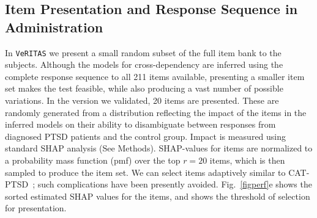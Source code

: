 \documentclass[onecolumn,10pt]{IEEEtran}
\def\Methods{Online Methods}
\def\Methods{Methods\xspace}
\def\vrts{\texttt{VeRITAS}\xspace}
\begin{document}
\subsection*{Item Presentation and Response Sequence in Administration}
In \vrts we present  a small random subset of the full item bank to the subjects. Although the models for cross-dependency are inferred using the complete response sequence to all 211 items available, presenting a smaller  item set makes the test feasible, while also producing a vast number of possible variations. In the version we validated, 20 items are presented. These are randomly generated from a distribution reflecting the  impact  of the items in the inferred models on their ability to disambiguate between responses from diagnosed PTSD patients and the control group. {\color{Red1} Impact is measured using standard SHAP analysis (See \Methods)}. SHAP-values for items are normalized to a probability mass function (pmf) over the top $r=20$ items, which is then sampled  to produce the item set. We can select items adaptively similar to CAT-PTSD~\cite{brenner2021development}; such  complications have been presently avoided. Fig.~\ref{figperf}e shows the sorted estimated SHAP values for the items, and shows the threshold of selection for presentation. 
\end{document}

